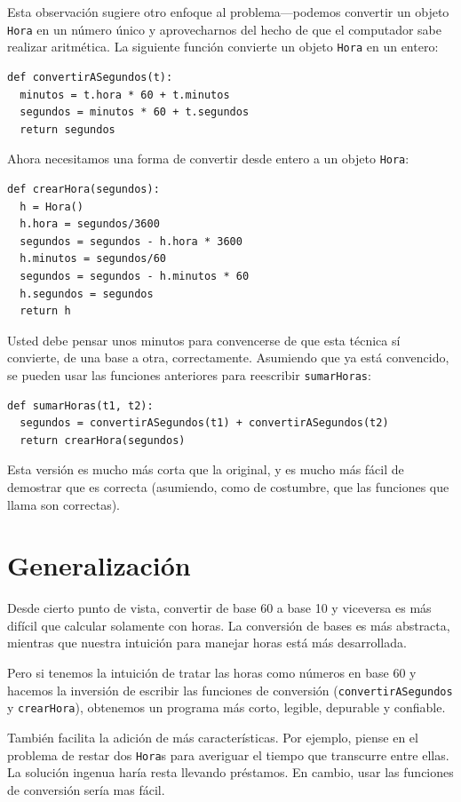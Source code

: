 Esta observación sugiere otro enfoque al problema—podemos convertir
un objeto \texttt{Hora} en un número único y aprovecharnos del hecho
de que el computador sabe realizar aritmética. La siguiente función
convierte un objeto \texttt{Hora} en un entero:
\begin{lstlisting}
def convertirASegundos(t):
  minutos = t.hora * 60 + t.minutos
  segundos = minutos * 60 + t.segundos
  return segundos
\end{lstlisting}
Ahora necesitamos una forma de convertir desde entero a un objeto
\texttt{Hora}:
\begin{lstlisting}
def crearHora(segundos):
  h = Hora()
  h.hora = segundos/3600
  segundos = segundos - h.hora * 3600
  h.minutos = segundos/60
  segundos = segundos - h.minutos * 60
  h.segundos = segundos
  return h
\end{lstlisting}
Usted debe pensar unos minutos para convencerse de que esta técnica
sí convierte, de una base a otra, correctamente. Asumiendo que ya
está convencido, se pueden usar las funciones anteriores para reescribir
\texttt{sumarHoras}:

\begin{lstlisting}
def sumarHoras(t1, t2):
  segundos = convertirASegundos(t1) + convertirASegundos(t2)
  return crearHora(segundos)
\end{lstlisting}
 Esta versión es mucho más corta que la original, y es mucho más fácil
de demostrar que es correcta (asumiendo, como de costumbre, que las
funciones que llama son correctas).

\section{Generalización}


Desde cierto punto de vista, convertir de base 60 a base 10 y viceversa
es más difícil que calcular solamente con horas. La conversión de
bases es más abstracta, mientras que nuestra intuición para manejar
horas está más desarrollada.

Pero si tenemos la intuición de tratar las horas como números en base
60 y hacemos la inversión de escribir las funciones de conversión
(\texttt{convertirASegundos} y \texttt{crearHora}), obtenemos un programa
más corto, legible, depurable y confiable.

También facilita la adición de más características. Por ejemplo, piense
en el problema de restar dos \texttt{Hora}s para averiguar el tiempo
que transcurre entre ellas. La solución ingenua haría resta llevando
préstamos. En cambio, usar las funciones de conversión sería mas fácil.

